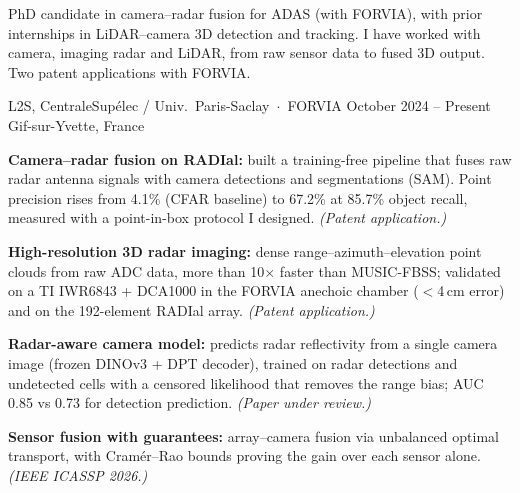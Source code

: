 




\noindent
PhD candidate in camera--radar fusion for ADAS (with FORVIA), with prior internships in
LiDAR--camera 3D detection and tracking. I have worked with camera, imaging radar and LiDAR,
from raw sensor data to fused 3D output. Two patent applications with FORVIA.
\vspace{1pt}


%
        {L2S, CentraleSupélec / Univ.\ Paris-Saclay \,$\cdot$\, FORVIA}%
        {October 2024 -- Present}%
        {Gif-sur-Yvette, France}
\begin{cvitems}
  \item \textbf{Camera--radar fusion on RADIal:} built a training-free pipeline that fuses raw
        radar antenna signals with camera detections and segmentations (SAM). Point precision
        rises from 4.1\% (CFAR baseline) to 67.2\% at 85.7\% object recall, measured with a
        point-in-box protocol I designed. \emph{(Patent application.)}
  \item \textbf{High-resolution 3D radar imaging:} dense range--azimuth--elevation point clouds
        from raw ADC data, more than 10$\times$ faster than MUSIC-FBSS; validated on a TI IWR6843
        + DCA1000 in the FORVIA anechoic chamber ($<$4\,cm error) and on the 192-element RADIal
        array. \emph{(Patent application.)}
  \item \textbf{Radar-aware camera model:} predicts radar reflectivity from a single camera image
        (frozen DINOv3 + DPT decoder), trained on radar detections and undetected cells with a
        censored likelihood that removes the range bias; AUC 0.85 vs 0.73 for detection
        prediction. \emph{(Paper under review.)}
  \item \textbf{Sensor fusion with guarantees:} array--camera fusion via unbalanced optimal
        transport, with Cramér--Rao bounds proving the gain over each sensor alone.
        \emph{(IEEE ICASSP 2026.)}
\end{cvitems}

